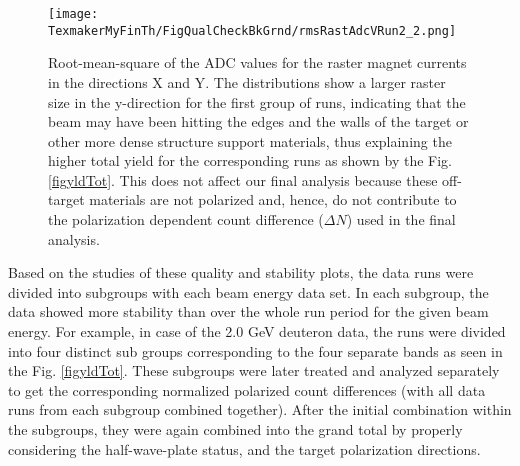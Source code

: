 \begin{figure}%
  \leavevmode \texttt{[image: TexmakerMyFinTh/FigQualCheckBkGrnd/rmsRastAdcVRun2\_2.png]} 
  \caption[RMS of raster ADCs]{Root-mean-square of the ADC values for the raster magnet currents in the directions %
  X and Y. The distributions show a larger raster size in the y-direction for the first group of runs, indicating that the beam may have been hitting the edges and the walls of the target or other more dense structure support materials, thus explaining the higher total yield for the corresponding runs as shown by the Fig. \ref{figyldTot}. This does not affect our final analysis because these off-target materials are not polarized and, hence, do not contribute to the polarization dependent count difference ($\Delta N$) used in the final analysis.}
  \label{figrstADCs}
\end{figure}

Based on the  studies of these quality and stability plots, the data runs were divided into subgroups with each beam energy data set. In each subgroup, the data showed more stability than over the whole run period for the given beam energy. For example, in case of the 2.0 GeV deuteron data, the runs were divided into four distinct sub groups corresponding to the four separate bands as seen in the Fig. \ref{figyldTot}. These subgroups were later treated and analyzed separately to get the corresponding normalized polarized count differences (with all data runs from each subgroup combined together). After the initial combination within the subgroups, they were again combined into the grand total by properly considering the half-wave-plate status, and the target polarization directions.




